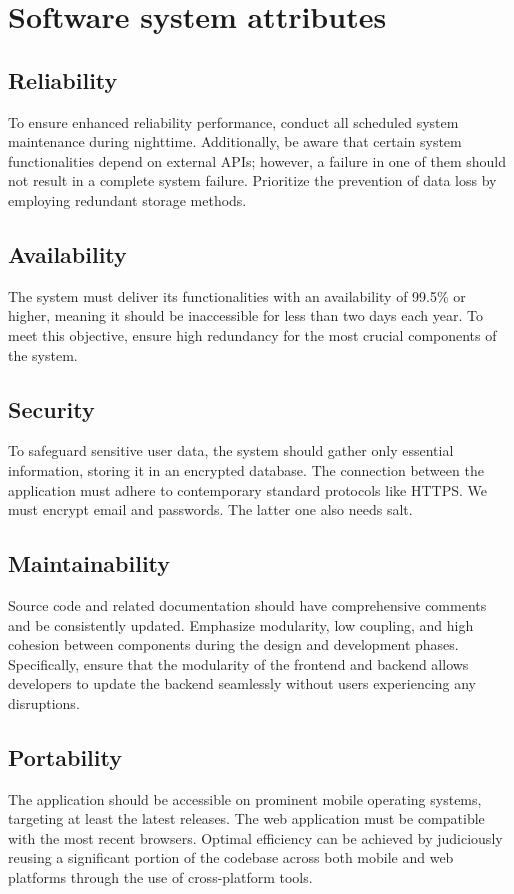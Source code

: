 \documentclass[12pt, a4paper]{report}
\begin{document}
    \section{Software system attributes}

    \subsection{Reliability}
    To ensure enhanced reliability performance, conduct all scheduled system maintenance during nighttime. 
    Additionally, be aware that certain system functionalities depend on external APIs; however, a failure in one of them should not result in a complete system failure. 
    Prioritize the prevention of data loss by employing redundant storage methods.

    \subsection{Availability}
    The system must deliver its functionalities with an availability of 99.5\% or higher, meaning it should be inaccessible for less than two days each year.
    To meet this objective, ensure high redundancy for the most crucial components of the system.

    \subsection{Security}
    To safeguard sensitive user data, the system should gather only essential information, storing it in an encrypted database. 
    The connection between the application must adhere to contemporary standard protocols like HTTPS.
    We must encrypt email and passwords. 
    The latter one also needs salt. 

    \subsection{Maintainability}
    Source code and related documentation should have comprehensive comments and be consistently updated. 
    Emphasize modularity, low coupling, and high cohesion between components during the design and development phases. 
    Specifically, ensure that the modularity of the frontend and backend allows developers to update the backend seamlessly without users experiencing any disruptions.

    \subsection{Portability}
    The application should be accessible on prominent mobile operating systems, targeting at least the latest releases. 
    The web application must be compatible with the most recent browsers. 
    Optimal efficiency can be achieved by judiciously reusing a significant portion of the codebase across both mobile and web platforms through the use of cross-platform tools.
\end{document}
